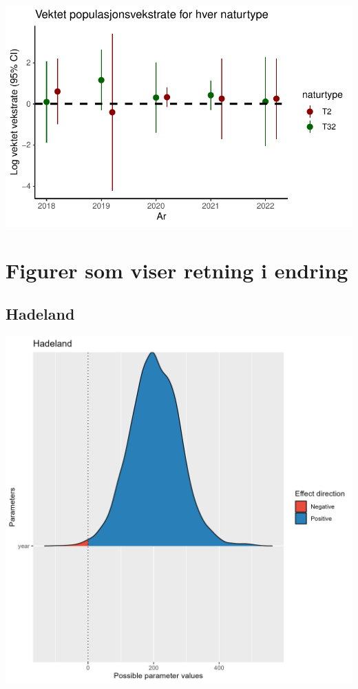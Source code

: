 \documentclass[
  letterpaper,
  DIV=11,
  numbers=noendperiod]{scrreport}
\begin{document}
\includegraphics{growthRate_meta_files/figure-pdf/unnamed-chunk-6-1.pdf}


\hypertarget{figurer-som-viser-retning-i-endring}{%
\chapter{Figurer som viser retning i
endring}\label{figurer-som-viser-retning-i-endring}}

\hypertarget{hadeland-2}{%
\section{Hadeland}\label{hadeland-2}}

\includegraphics{data/derived_data/direction_plots/plots/Hadeland.png}
\end{document}
